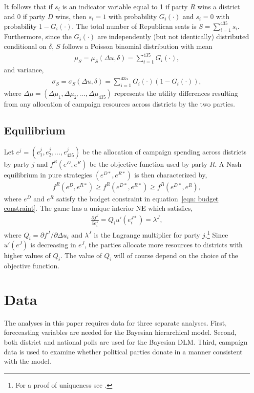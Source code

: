 \documentclass[12pt,final,fleqn]{article}
\theoremstyle{plain}
\begin{document}
It follows that if $s_i$ is an indicator variable equal to 1 if party $R$ wins a district and $0$ if party $D$ wins, then $s_i = 1$ with probability $G_i(\cdot)$ and $s_i = 0$ with probability $1 - G_i(\cdot)$. The total number of Republican seats is $S = \sum_{i=1}^{435} s_i$. Furthermore, since the $G_i(\cdot)$ are independently (but not identically) distributed conditional on $\delta$, $S$ follows a Poisson binomial distribution with mean
\begin{align} \label{eqn: conditional seat mean}
\mu_S = \mu_S(\Delta u, \delta) =  \sum_{i=1}^{435} G_i(\cdot),
\end{align}
and variance,
\begin{align} \label{eqn: conditional seat variance}
\sigma_S = \sigma_S(\Delta u, \delta) = \sum_{i=1}^{435} G_i(\cdot)(1 - G_i(\cdot)),
\end{align}
where $\Delta \mu = \left(\Delta \mu_1, \Delta \mu_2, \ldots, \Delta \mu_{435} \right)$ represents the utility differences resulting from any allocation of campaign resources across districts by the two parties.

\subsection{Equilibrium}
Let $e^j = (e_1^j, e_2^j, \ldots, e_{435}^j)$ be the allocation of campaign spending across districts by party $j$ and $f^R(e^D, e^R)$ be the objective function used by party $R$. A Nash equilibrium in pure strategies $(e^{D*}, e^{R*})$ is then characterized by,
\begin{align}
f^R(e^D, e^{R*}) \geq f^R(e^{D*}, e^{R*}) \geq f^R(e^{D*}, e^{R}),
\end{align}
where $e^D$ and $e^R$ satisfy the budget constraint in equation~\ref{eqn: budget constraint}. The game has a unique interior NE which satisfies,
\begin{align}
\frac{\partial f^J}{\partial e_i^J}= Q_i u'(e^{J*}_i)=\lambda^J,
\end{align}
where $Q_i = \partial f^J/ \partial \Delta u_i$ and $\lambda^J$ is the Lagrange multiplier for party $j$.\footnote{For a proof of uniqueness see \citet{stromberg2008electoral}.} Since $u'(e^J)$ is decreasing in $e^J$, the parties allocate more resources to districts with higher values of $Q_i$. The value of $Q_i$ will of course depend on the choice of the objective function.

\section{Data}
The analyses in this paper requires data for three separate analyses. First, foreceasting variables are needed for the Bayesian hierarchical model. Second, both district and national polls are used for the Bayesian DLM. Third, campaign data is used to examine whether political parties donate in a manner consistent with the model.
\end{document}
